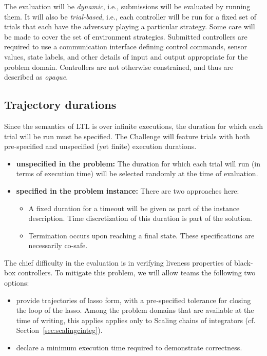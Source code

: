 \documentclass{amsart}
\theoremstyle{definition}
\begin{document}
The evaluation will be \emph{dynamic}, i.e., submissions will be evaluated by
running them. It will also be \emph{trial-based}, i.e., each controller will be
run for a fixed set of trials that each have the adversary playing a particular
strategy. Some care will be made to cover the set of environment
strategies. Submitted controllers are required to use a communication interface
defining control commands, sensor values, state labels, and other details of
input and output appropriate for the problem domain. Controllers are not
otherwise constrained, and thus are described as \emph{opaque}.

\subsection{Trajectory durations}
Since the semantics of LTL is over infinite executions, the duration for which each trial will be run must be specified. 
The Challenge will feature trials with both pre-specified and unspecified (yet finite) execution durations. 

\begin{itemize}
\item \textbf{unspecified in the problem:}
The duration for which each trial will run (in terms of execution time) will be selected randomly at the time of evaluation.

\item \textbf{specified in the problem instance:}
There are two approaches here:
\begin{itemize}
\item A fixed duration for a timeout will be given as part of the instance description. Time discretization of this duration is part of the solution.
\item Termination occurs upon reaching a final state. These specifications are necessarily co-safe.
\end{itemize}

\end{itemize}

The chief difficulty in the evaluation is in verifying liveness properties of black-box controllers. To mitigate this problem,
we will allow teams the following two options:
\begin{itemize}
\item provide trajectories of lasso form, with a pre-specified tolerance for closing the loop of the lasso. Among the problem domains that are available at the time of writing, this applies applies only to Scaling chains of integrators (cf. Section~\ref{sec:scalingcinteg}).
\item declare a minimum execution time required to demonstrate correctness.
\end{itemize}
\end{document}
